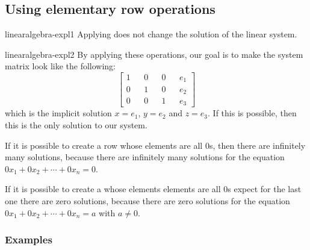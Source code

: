 \documentclass[preview]{standalone}
\begin{document}
\subsection{Using elementary row operations}

\begin{snippet}{linearalgebra-expl1}
    Applying 
    does not change the solution of the linear system.
\end{snippet}


\begin{snippet}{linearalgebra-expl2}
By applying these operations, our goal is to make the system matrix
look like the following:
\[
    \begin{bmatrix} 
        1 && 0 && 0 && e_1 \\
        0 && 1 && 0 && e_2 \\
        0 && 0 && 1 && e_3
    \end{bmatrix}
\]
which is the implicit solution
\(x=e_1\), \(y=e_2\) and \(z=e_3\).
If this is possible, then this is the only solution to our system.

\vspace{.25cm}

If it is possible to create a row whose elements are all \(0\)s,
then there are infinitely many solutions, because
there are infinitely many solutions for the equation
\(0x_1+0x_2+\cdots+0x_n = 0\).

\vspace{.25cm}

If it is possible to create a whose elements elements
are all \(0\)s expect for the last one there are zero solutions,
because there are zero solutions for the equation
\(0x_1+0x_2+\cdots+0x_n = a\) with \(a \neq 0\).
\end{snippet}

\subsubsection{Examples}



\end{document}
